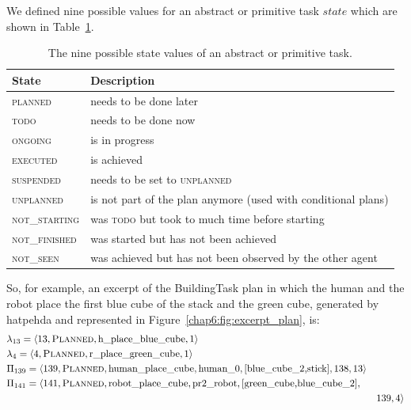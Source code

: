 \documentclass[a4paper,11pt,twoside]{StyleThese}
\begin{document}
We defined nine possible values for an abstract or primitive task $state$ which are shown in Table~\ref{chap6:tab:task_states}. 

\begin{table}[h]
	\centering
	\begin{tabular}{l|l}
		State            & Description         \\\hline\hline
		\textsc{planned} & needs to be done later        \\
		\textsc{todo}            & needs to be done now   \\
		\textsc{ongoing}          & is in progress       \\
		\textsc{executed}         & is achieved               \\
		\textsc{suspended}        & needs to be set to \textsc{unplanned}\\ 
		\textsc{unplanned} & is not part of the plan anymore (used with conditional plans) \\
		\textsc{not\_starting}    & was \textsc{todo} but took to much time before starting \\
		\textsc{not\_finished}     & was started but has not been achieved    \\
		\textsc{not\_seen}         & was achieved but has not been observed by the other agent    
	\end{tabular}
	\caption{The nine possible state values of an abstract or primitive task.}
	\label{chap6:tab:task_states}
\end{table}

So, for example, an excerpt of the BuildingTask plan in which the human and the robot place the first blue cube of the stack and the green cube, generated by \acrshort{hatpehda} and represented in Figure~\ref{chap6:fig:excerpt_plan}, is:
\thispagestyle{example}
\begin{align*}
&\lambda_{13}=\langle 13,\textsc{Planned},\text{h\_place\_blue\_cube},1\rangle \\
&\lambda_{4}=\langle 4,\textsc{Planned},\text{r\_place\_green\_cube},1\rangle \\
&\Pi_{139}=\langle 139,\textsc{Planned},\text{human\_place\_cube},\text{human\_0}, [\text{blue\_cube\_2,stick}],138,13\rangle \\
&\Pi_{141}=\langle 141,\textsc{Planned},\text{robot\_place\_cube},\text{pr2\_robot},[\text{green\_cube,blue\_cube\_2}], &\\  & &139,4\rangle
\end{align*}
\end{document}
